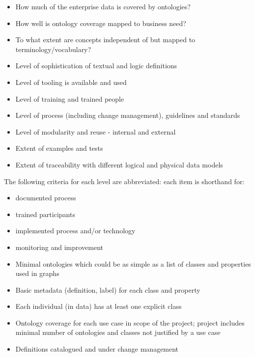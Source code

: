 \begin{itemize}
    \item How much of the enterprise data is covered by ontologies?
    \item How well is ontology coverage mapped to business need?
    \item To what extent are concepts independent of but mapped to terminology/vocabulary?
    \item Level of sophistication of textual and logic definitions
    \item Level of tooling is available and used
    \item Level of training and trained people
    \item Level of process (including change management), guidelines and standards
    \item Level of modularity and reuse - internal and external
    \item Extent of examples and tests
    \item Extent of traceability with different logical and physical data models
\end{itemize}

\ekgmmCapabilitySectionLevels

The following criteria for each level are abbreviated: each item is shorthand for:

\begin{itemize}
    \item documented process
    \item trained participants
    \item implemented process and/or technology
    \item monitoring and improvement
\end{itemize}

\ekgmmCapabilitySectionLevelsOneFive

\ekgmmscoringlevelOne

\begin{itemize}
    \item Minimal ontologies which could be as simple as a list of classes and properties used in graphs
    \item Basic metadata (definition, label) for each class and property
    \item Each individual (in data) has at least one explicit class
    \item Ontology coverage for each use case in scope of the project;
          project includes minimal number of ontologies and classes not justified by a use case
    \item Definitions catalogued and under change management

\end{itemize}

